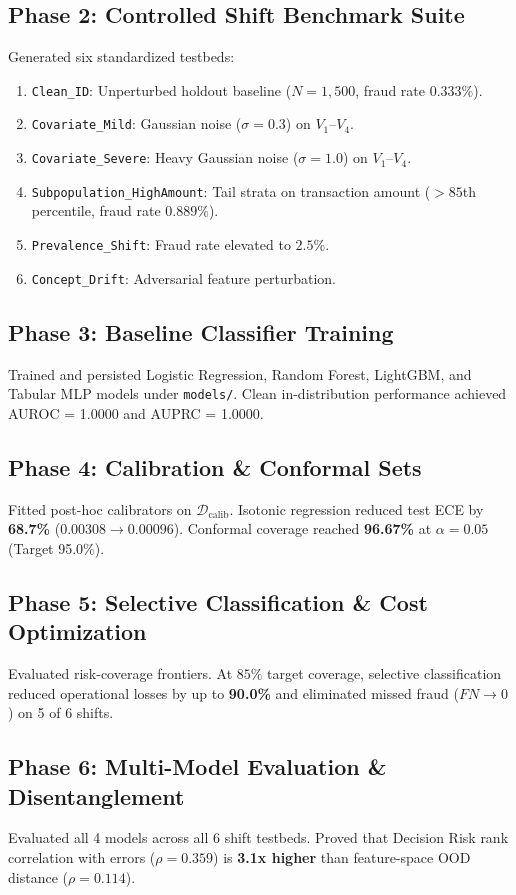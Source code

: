 \documentclass[10pt,a4paper,twocolumn]{article}
\begin{document}
\subsection{Phase 2: Controlled Shift Benchmark Suite}
Generated six standardized testbeds:
\begin{enumerate}
  \item \texttt{Clean\_ID}: Unperturbed holdout baseline ($N=1,500$, fraud rate $0.333\%$).
  \item \texttt{Covariate\_Mild}: Gaussian noise ($\sigma=0.3$) on $V_1$–$V_4$.
  \item \texttt{Covariate\_Severe}: Heavy Gaussian noise ($\sigma=1.0$) on $V_1$–$V_4$.
  \item \texttt{Subpopulation\_HighAmount}: Tail strata on transaction amount ($>85$th percentile, fraud rate $0.889\%$).
  \item \texttt{Prevalence\_Shift}: Fraud rate elevated to $2.5\%$.
  \item \texttt{Concept\_Drift}: Adversarial feature perturbation.
\end{enumerate}

\subsection{Phase 3: Baseline Classifier Training}
Trained and persisted Logistic Regression, Random Forest, LightGBM, and Tabular MLP models under \texttt{models/}. Clean in-distribution performance achieved AUROC = 1.0000 and AUPRC = 1.0000.

\subsection{Phase 4: Calibration \& Conformal Sets}
Fitted post-hoc calibrators on $\mathcal{D}_{\text{calib}}$. Isotonic regression reduced test ECE by \textbf{68.7\%} ($0.00308 \to 0.00096$). Conformal coverage reached \textbf{96.67\%} at $\alpha=0.05$ (Target 95.0\%).

\subsection{Phase 5: Selective Classification \& Cost Optimization}
Evaluated risk-coverage frontiers. At $85\%$ target coverage, selective classification reduced operational losses by up to \textbf{90.0\%} and eliminated missed fraud ($FN \to 0$) on 5 of 6 shifts.

\subsection{Phase 6: Multi-Model Evaluation \& Disentanglement}
Evaluated all 4 models across all 6 shift testbeds. Proved that Decision Risk rank correlation with errors ($\rho = 0.359$) is \textbf{3.1x higher} than feature-space OOD distance ($\rho = 0.114$).
\end{document}
